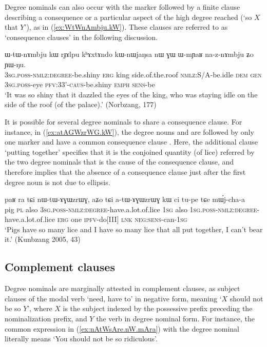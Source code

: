 Degree nominals can also occur with the marker  followed by a finite clause describing a consequence or a particular aspect of the high degree reached (`so $X$ that $Y$'), as in (\ref{ex:WtWnAmbju.kW}). These clauses are referred to as `consequence clauses' in the following discussion.

\begin{exe}
\ex \label{ex:WtWnAmbju.kW}
\gll ɯ-tɯ-nɤmbju kɯ rɟɤlpu kʰɤxtɤndo kɯ-nɯjaŋsa nɯ ɣɯ ɯ-mɲaʁ na-z-nɤmbju ʑo ɲɯ-ŋu. \\
\textsc{3sg}.\textsc{poss}-\textsc{nmlz}:\textsc{degree}-be.shiny \textsc{erg} king side.of.the.roof \textsc{nmlz}:S/A-be.idle \textsc{dem} \textsc{gen} \textsc{3sg}.\textsc{poss}-eye \textsc{pfv}:3\fl{}3'-\textsc{caus}-be.shiny \textsc{emph} \textsc{sens}-be\\
\glt `It was so shiny that it dazzled the eyes of the king, who was staying idle on the side of the roof (of the palace).' (Norbzang, 177)
\end{exe}

It is possible for several degree nominals to share a consequence clause. For instance, in (\ref{ex:atAGWzrWG.kW}), the degree nouns  and  are followed by only one marker  and have a common consequence clause . Here, the additional clause  `putting together' specifies that it is the conjoined quantity (of lice) referred by the two degree nominals that is the cause of the consequence clause, and therefore implies that the absence of a consequence clause just after the first degree noun  is not due to ellipsis.

\begin{exe}
\ex \label{ex:atAGWzrWG.kW}
\gll paʁ ra tɕi nɯ-tɯ-ɤɣɯzrɯɣ, aʑo tɕi a-tɯ-ɤɣɯzrɯɣ kɯ ci tu-pe tɕe mɯ́j-cha-a \\
pig \textsc{pl} also \textsc{3sg}.\textsc{poss}-\textsc{nmlz}:\textsc{degree}-have.a.lot.of.lice \textsc{1sg} also \textsc{1sg}.\textsc{poss}-\textsc{nmlz}:\textsc{degree}-have.a.lot.of.lice \textsc{erg} one \textsc{ipfv}-do[III] \textsc{lnk} \textsc{neg}:\textsc{sens}-can-\textsc{1sg} \\
\glt `Pigs have so many lice and I have so many lice that all put together, I can't bear it.' (Kunbzang 2005, 43)
\end{exe}


\subsection{Complement clauses} \label{sec:degree.nominal.complement}
Degree nominals are marginally attested in complement clauses, as subject clauses of the modal verb  `need, have to' in negative form, meaning `$X$ should not be so $Y$', where $X$ is the subject indexed by the possessive prefix preceding the  nominalization prefix, and $Y$ the verb in degree nominal form. For instance, the common expression in (\ref{ex:nAtWsAre.nW.mAra}) with the degree nominal  literally means `You should not be so ridiculous'.  

